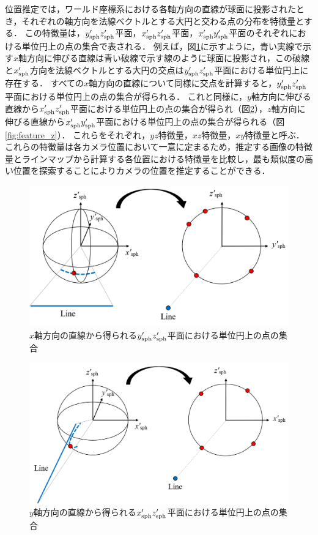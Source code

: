 位置推定では，ワールド座標系における各軸方向の直線が球面に投影されたとき，それぞれの軸方向を法線ベクトルとする大円と交わる点の分布を特徴量とする．
この特徴量は，$y'_{\rm{sph}}z'_{\rm{sph}}$平面，$x'_{\rm{sph}}z'_{\rm{sph}}$平面，$x'_{\rm{sph}}y'_{\rm{sph}}$平面のそれぞれにおける単位円上の点の集合で表される．
例えば，図\ref{fig:feature_x}に示すように，青い実線で示す$x$軸方向に伸びる直線は青い破線で示す線のように球面に投影され，この破線と$x'_{\rm{sph}}$方向を法線ベクトルとする大円の交点は$y'_{\rm{sph}}z'_{\rm{sph}}$平面における単位円上に存在する．
すべての$x$軸方向の直線について同様に交点を計算すると，$y'_{\rm{sph}}z'_{\rm{sph}}$平面における単位円上の点の集合が得られる．
これと同様に，$y$軸方向に伸びる直線から$x'_{\rm{sph}}z'_{\rm{sph}}$平面における単位円上の点の集合が得られ（図\ref{fig:feature_y}），$z$軸方向に伸びる直線から$x'_{\rm{sph}}y'_{\rm{sph}}$平面における単位円上の点の集合が得られる（図\ref{fig:feature_z}）．
これらをそれぞれ，$yz$特徴量，$xz$特徴量，$xy$特徴量と呼ぶ．
これらの特徴量は各カメラ位置において一意に定まるため，推定する画像の特徴量とラインマップから計算する各位置における特徴量を比較し，最も類似度の高い位置を探索することによりカメラの位置を推定することができる．
\\

\begin{figure}[tb]
 \begin{center}
 \includegraphics[width=0.85\columnwidth]{./chap4/fig/feature_x.png}
 \caption{$x$軸方向の直線から得られる$y'_{\rm{sph}}z'_{\rm{sph}}$平面における単位円上の点の集合}
 \label{fig:feature_x}
 \end{center}
\end{figure}

\begin{figure}[tb]
 \begin{center}
 \includegraphics[width=0.85\columnwidth]{./chap4/fig/feature_y.png}
 \caption{$y$軸方向の直線から得られる$x'_{\rm{sph}}z'_{\rm{sph}}$平面における単位円上の点の集合}
 \label{fig:feature_y}
 \end{center}
\end{figure}

